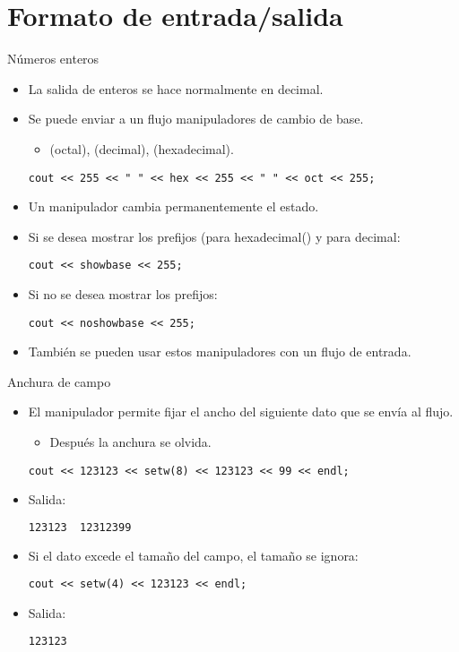 \section{Formato de entrada/salida}

\begin{frame}[fragile]{Números enteros}
\begin{itemize}
  \item La salida de enteros se hace normalmente en decimal.
  \item Se puede enviar a un flujo manipuladores de cambio de base.
    \begin{itemize}
      \item {} (octal),  (decimal),  (hexadecimal).
    \end{itemize}
\begin{lstlisting}
cout << 255 << " " << hex << 255 << " " << oct << 255;
\end{lstlisting}
  \item Un manipulador cambia permanentemente el estado.
  \item Si se desea mostrar los prefijos  (para hexadecimal() y  para decimal:
\begin{lstlisting}
cout << showbase << 255;
\end{lstlisting}
  \item Si no se desea mostrar los prefijos:
\begin{lstlisting}
cout << noshowbase << 255;
\end{lstlisting}
  \item También se pueden usar estos manipuladores con un flujo de entrada.
\end{itemize}
\end{frame}

\begin{frame}[fragile]{Anchura de campo}
\begin{itemize}
  \item El manipulador  permite fijar el ancho del siguiente dato que se envía al flujo.
    \begin{itemize}
      \item Después la anchura \alert{se olvida}.
    \end{itemize}
\begin{lstlisting}
cout << 123123 << setw(8) << 123123 << 99 << endl;
\end{lstlisting}
  \item Salida:
\begin{lstlisting}[language=bash]
123123  12312399
\end{lstlisting}
  \item Si el dato excede el tamaño del campo, el tamaño se ignora:
\begin{lstlisting}
cout << setw(4) << 123123 << endl;
\end{lstlisting}
  \item Salida:
\begin{lstlisting}[language=bash]
123123
\end{lstlisting}
\end{itemize}
\end{frame}

